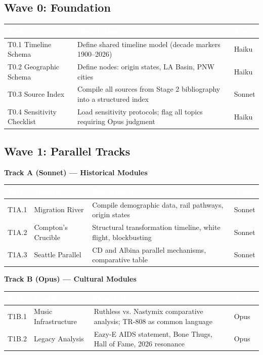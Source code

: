 \documentclass[11pt,letterpaper]{article}
\newcommand{\tableheader}[1]{\textbf{\sffamily\textcolor{white}{#1}}}
\begin{document}
\subsection{Wave 0: Foundation}

\begin{center}
\begin{tabularx}{\textwidth}{L{3cm}XL{2cm}}
\toprule
{}
\tableheader{Task} & \tableheader{Description} & \tableheader{Agent} \\
\midrule
T0.1 Timeline Schema & Define shared timeline model (decade markers 1900--2026) & Haiku \\
T0.2 Geographic Schema & Define nodes: origin states, LA Basin, PNW cities & Haiku \\
T0.3 Source Index & Compile all sources from Stage 2 bibliography into a structured index & Sonnet \\
T0.4 Sensitivity Checklist & Load sensitivity protocols; flag all topics requiring Opus judgment & Haiku \\
\bottomrule
\end{tabularx}
\end{center}

\subsection{Wave 1: Parallel Tracks}

\textbf{Track A (Sonnet) --- Historical Modules}

\begin{center}
\begin{tabularx}{\textwidth}{L{2cm}L{2.5cm}XL{2cm}}
\toprule
{}
\tableheader{Task} & \tableheader{Module} & \tableheader{Description} & \tableheader{Agent} \\
\midrule
T1A.1 & Migration River & Compile demographic data, rail pathways, origin states & Sonnet \\
T1A.2 & Compton's Crucible & Structural transformation timeline, white flight, blockbusting & Sonnet \\
T1A.3 & Seattle Parallel & CD and Albina parallel mechanisms, comparative table & Sonnet \\
\bottomrule
\end{tabularx}
\end{center}

\textbf{Track B (Opus) --- Cultural Modules}

\begin{center}
\begin{tabularx}{\textwidth}{L{2cm}L{2.5cm}XL{2cm}}
\toprule
{}
\tableheader{Task} & \tableheader{Module} & \tableheader{Description} & \tableheader{Agent} \\
\midrule
T1B.1 & Music Infrastructure & Ruthless vs. Nastymix comparative analysis; TR-808 as common language & Opus \\
T1B.2 & Legacy Analysis & Eazy-E AIDS statement, Bone Thugs, Hall of Fame, 2026 resonance & Opus \\
\bottomrule
\end{tabularx}
\end{center}
\end{document}
